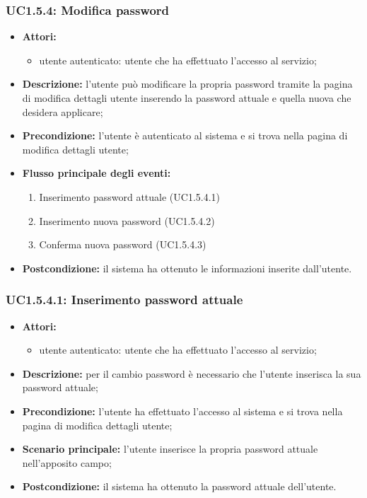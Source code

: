 \subsubsection{UC1.5.4: Modifica password}
\begin{itemize}
	\item \textbf{Attori:}
	\begin{itemize}
		\item utente autenticato: utente che ha effettuato l'accesso al servizio;
	\end{itemize}
	\item \textbf{Descrizione:} l'utente può modificare la propria password tramite la pagina di modifica dettagli utente inserendo la password attuale e quella nuova che desidera applicare;
	\item \textbf{Precondizione:} l'utente è autenticato al sistema e si trova nella pagina di modifica dettagli utente;
	\item \textbf{Flusso principale degli eventi:}
	\begin{enumerate}
		\item Inserimento password attuale (UC1.5.4.1)
		\item Inserimento nuova password (UC1.5.4.2)
		\item Conferma nuova password (UC1.5.4.3)
	\end{enumerate}
	\item \textbf{Postcondizione:} il sistema ha ottenuto le informazioni inserite dall'utente.
\end{itemize}

\subsubsection{UC1.5.4.1: Inserimento password attuale}
\begin{itemize}
	\item \textbf{Attori:}
	\begin{itemize}
		\item utente autenticato: utente che ha effettuato l'accesso al servizio;
	\end{itemize}
	\item \textbf{Descrizione:} per il cambio password è necessario che l'utente inserisca la sua password attuale;
	\item \textbf{Precondizione:} l'utente ha effettuato l'accesso al sistema e si trova nella pagina di modifica dettagli utente;
	\item \textbf{Scenario principale:} l'utente inserisce la propria password attuale nell'apposito campo;
	\item \textbf{Postcondizione:} il sistema ha ottenuto la password attuale dell'utente.
\end{itemize}

